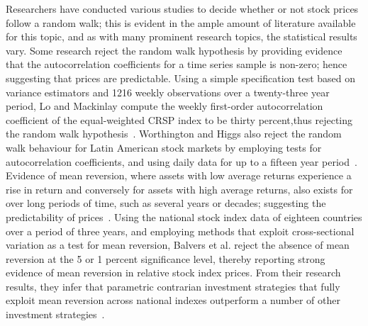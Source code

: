 \documentclass[13pt]{report}
\begin{document}
Researchers have conducted various studies to decide whether or not stock prices follow a random walk; this is evident in the ample amount of literature available for this topic, and as with many prominent research topics, the statistical results vary. Some research reject the random walk hypothesis by providing evidence that the autocorrelation coefficients for a time series sample is non-zero; hence suggesting that prices are predictable. Using a simple specification test based on variance estimators and 1216 weekly observations over a twenty-three year period, Lo and Mackinlay compute the weekly first-order autocorrelation coefficient of the equal-weighted CRSP index to be thirty percent,thus rejecting the random walk hypothesis~\cite{lo1988stock}. Worthington and Higgs also reject the random walk behaviour for Latin American stock markets by employing tests for autocorrelation coefficients, and using daily data for up to a fifteen year period~\cite{worthington2003empirical}. Evidence of mean reversion, where assets with low average returns experience a rise in return and conversely for assets with high average returns, also exists for over long periods of time, such as several years or decades; suggesting the predictability of prices~\cite{bailey2005economics}. Using the national stock index data of eighteen countries over a period of three years, and employing methods that exploit cross-sectional variation as a test for mean reversion, Balvers et al. reject the absence of mean reversion at the 5 or 1 percent
significance level, thereby reporting strong evidence of mean reversion in relative stock index prices. From their research results, they infer that parametric contrarian investment strategies that fully exploit mean reversion across national indexes outperform a number of other investment strategies~\cite{balvers2000mean}.
\end{document}
